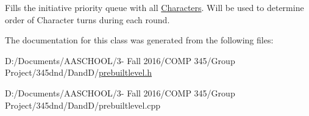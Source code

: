 Fills the initiative priority queue with all \hyperlink{class_characters}{Characters}. Will be used to determine order of Character turns during each round. 

The documentation for this class was generated from the following files\+:\begin{DoxyCompactItemize}
\item 
D\+:/\+Documents/\+A\+A\+S\+C\+H\+O\+O\+L/3-\/ Fall 2016/\+C\+O\+M\+P 345/\+Group Project/345dnd/\+Dand\+D/\hyperlink{prebuiltlevel_8h}{prebuiltlevel.\+h}\item 
D\+:/\+Documents/\+A\+A\+S\+C\+H\+O\+O\+L/3-\/ Fall 2016/\+C\+O\+M\+P 345/\+Group Project/345dnd/\+Dand\+D/prebuiltlevel.\+cpp\end{DoxyCompactItemize}
